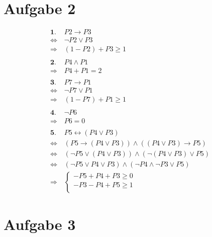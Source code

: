 \documentclass[a4paper,11pt]{article}
\begin{document}
\section*{Aufgabe 2}
\begin{align*}
\textbf{1. } & P2 \to P3 \\
\Leftrightarrow & \neg P2 \lor P3 \\
\Rightarrow  & (1 - P2) + P3 \ge 1 \\ \\
%
\textbf{2. } & P4 \land P1 \\
\Rightarrow  & P4 + P1 = 2 \\ \\
%
\textbf{3. } & P7 \to P1 \\
\Leftrightarrow & \neg P7 \lor P1 \\
\Rightarrow  & (1 - P7) + P1 \ge 1 \\ \\
%
\textbf{4. } & \neg P6 \\
\Rightarrow & P6 = 0 \\ \\
%
\textbf{5. } & P5 \leftrightarrow (P4 \lor P3) \\
\Leftrightarrow & (P5 \to (P4 \lor P3)) \land ((P4 \lor P3) \to P5) \\
\Leftrightarrow & (\neg P5 \lor (P4 \lor P3)) \land (\neg (P4 \lor P3) \lor P5) \\
\Leftrightarrow & (\neg P5 \lor P4 \lor P3) \land (\neg P4 \land \neg P3 \lor P5) \\
\Rightarrow & \left\{\begin{array}{l}
                    -P5 + P4 + P3 \ge 0 \\
                    -P3 -P4 + P5 \ge 1 \\
                \end{array}\right.
\end{align*}


\section*{Aufgabe 3}
\end{document}

